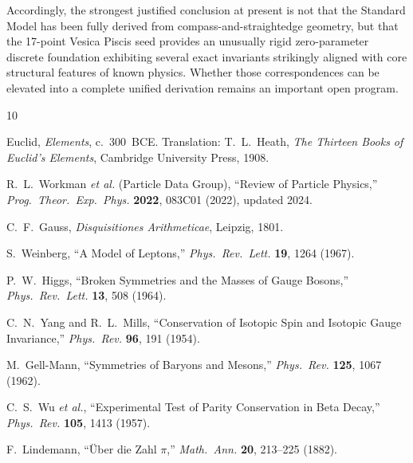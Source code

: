 \documentclass[12pt, a4paper]{article}
\begin{document}
Accordingly, the strongest justified conclusion at present is not that the Standard Model has been fully derived from compass-and-straightedge geometry, but that the 17-point Vesica Piscis seed provides an unusually rigid zero-parameter discrete foundation exhibiting several exact invariants strikingly aligned with core structural features of known physics. Whether those correspondences can be elevated into a complete unified derivation remains an important open program.

\begin{thebibliography}{10}

Euclid,
\textit{Elements},
c.~300~BCE.
Translation: T.~L.~Heath, \textit{The Thirteen Books of Euclid's Elements},
Cambridge University Press, 1908.

R.~L.~Workman \textit{et al.} (Particle Data Group),
``Review of Particle Physics,''
\textit{Prog.~Theor.~Exp.~Phys.} \textbf{2022}, 083C01 (2022),
updated 2024.

C.~F.~Gauss,
\textit{Disquisitiones Arithmeticae},
Leipzig, 1801.

S.~Weinberg,
``A Model of Leptons,''
\textit{Phys.~Rev.~Lett.} \textbf{19}, 1264 (1967).

P.~W.~Higgs,
``Broken Symmetries and the Masses of Gauge Bosons,''
\textit{Phys.~Rev.~Lett.} \textbf{13}, 508 (1964).

C.~N.~Yang and R.~L.~Mills,
``Conservation of Isotopic Spin and Isotopic Gauge Invariance,''
\textit{Phys.~Rev.} \textbf{96}, 191 (1954).

M.~Gell-Mann,
``Symmetries of Baryons and Mesons,''
\textit{Phys.~Rev.} \textbf{125}, 1067 (1962).

C.~S.~Wu \textit{et al.},
``Experimental Test of Parity Conservation in Beta Decay,''
\textit{Phys.~Rev.} \textbf{105}, 1413 (1957).

F.~Lindemann,
``\"{U}ber die Zahl $\pi$,''
\textit{Math.~Ann.} \textbf{20}, 213--225 (1882).

\end{thebibliography}
\end{document}
